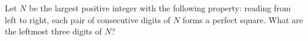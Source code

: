 Let $N$ be the largest positive integer with the following property: reading from left to right, each pair of consecutive digits of $N$ forms a perfect square. What are the leftmost three digits of $N$?